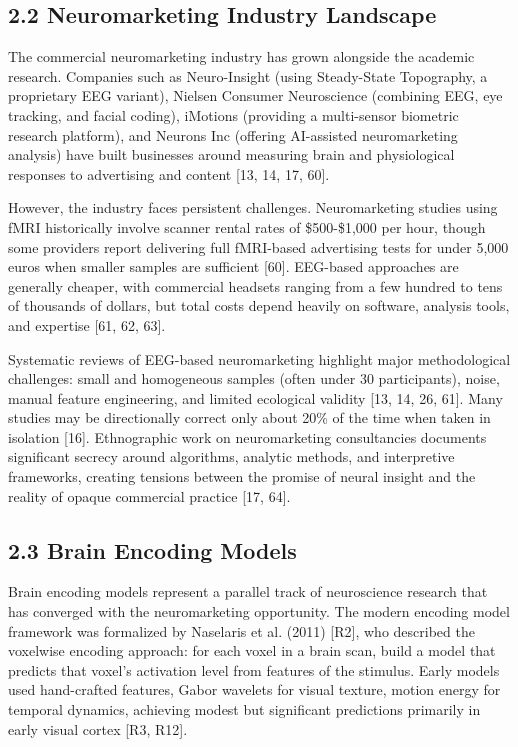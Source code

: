 \documentclass[11pt,letterpaper]{article}
\begin{document}
\subsection{2.2 Neuromarketing Industry Landscape}

The commercial neuromarketing industry has grown alongside the academic research. Companies such as Neuro-Insight (using Steady-State Topography, a proprietary EEG variant), Nielsen Consumer Neuroscience (combining EEG, eye tracking, and facial coding), iMotions (providing a multi-sensor biometric research platform), and Neurons Inc (offering AI-assisted neuromarketing analysis) have built businesses around measuring brain and physiological responses to advertising and content [13, 14, 17, 60].

However, the industry faces persistent challenges. Neuromarketing studies using fMRI historically involve scanner rental rates of \$500-\$1,000 per hour, though some providers report delivering full fMRI-based advertising tests for under 5,000 euros when smaller samples are sufficient [60]. EEG-based approaches are generally cheaper, with commercial headsets ranging from a few hundred to tens of thousands of dollars, but total costs depend heavily on software, analysis tools, and expertise [61, 62, 63].

Systematic reviews of EEG-based neuromarketing highlight major methodological challenges: small and homogeneous samples (often under 30 participants), noise, manual feature engineering, and limited ecological validity [13, 14, 26, 61]. Many studies may be directionally correct only about 20\% of the time when taken in isolation [16]. Ethnographic work on neuromarketing consultancies documents significant secrecy around algorithms, analytic methods, and interpretive frameworks, creating tensions between the promise of neural insight and the reality of opaque commercial practice [17, 64].

\subsection{2.3 Brain Encoding Models}

Brain encoding models represent a parallel track of neuroscience research that has converged with the neuromarketing opportunity. The modern encoding model framework was formalized by Naselaris et al. (2011) [R2], who described the voxelwise encoding approach: for each voxel in a brain scan, build a model that predicts that voxel's activation level from features of the stimulus. Early models used hand-crafted features, Gabor wavelets for visual texture, motion energy for temporal dynamics, achieving modest but significant predictions primarily in early visual cortex [R3, R12].
\end{document}
